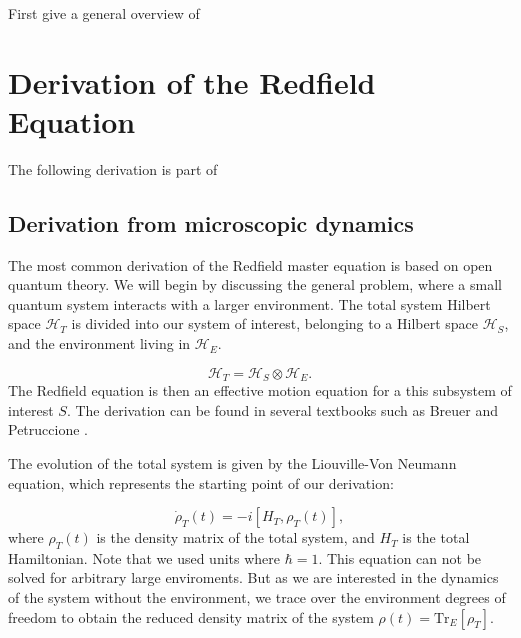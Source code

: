 First give a general overview of

\chapter{Derivation of the Redfield Equation} %
\label{Chapter:Derivation_Redfield_Equation} %

The following derivation is part of \cite{manzano2020shortintroductionlindblad}

\section{Derivation from microscopic dynamics}
\label{sec:Derivation_redfield_eq_from_microscopic_dynamics}
The most common derivation of the Redfield master equation is based on open quantum theory.
We will begin by discussing the general problem, where a small quantum system interacts with a larger environment.
The total system Hilbert space $\mathcal{H}_T$ is divided into our system of interest, belonging to a Hilbert space $\mathcal{H}_S$, and the environment living in $\mathcal{H}_E$.

\begin{equation}
    \mathcal{H}_T = \mathcal{H}_S \otimes \mathcal{H}_E.
    \label{eq:Total_Hilbert_Space}
\end{equation}
The Redfield equation is then an effective motion equation for a this subsystem of interest $ S $.
The derivation can be found in several textbooks such as Breuer and Petruccione \cite{breuerpetruccione2009theoryopenquantum}.

The evolution of the total system is given by the Liouville-Von Neumann equation, which represents the starting point of our derivation:

\begin{equation}
    \dot{\rho}_T(t) = -i[H_T, \rho_T(t)],
    \label{eq:Von_Neumann_Equation}
\end{equation}
where $\rho_T(t)$ is the density matrix of the total system, and $H_T$ is the total Hamiltonian.
Note that we used units where $\hbar = 1$.
This equation can not be solved for arbitrary large enviroments.
But as we are interested in the dynamics of the system without the environment,
we trace over the environment degrees of freedom to obtain the reduced density matrix of the system
$\rho(t) = \mathrm{Tr}_E[\rho_T]$.

